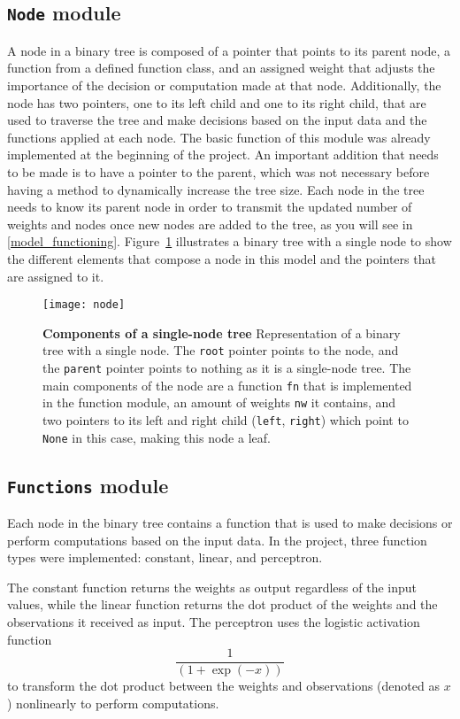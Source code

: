 \subsection{\texttt{Node} module}
A node in a binary tree is composed of a pointer that points to its parent node, a function from a defined function class, and an assigned weight that adjusts the importance of the decision or computation made at that node. Additionally, the node has two pointers, one to its left child and one to its right child, that are used to traverse the tree and make decisions based on the input data and the functions applied at each node. The basic function of this module was already implemented at the beginning of the project. An important addition that needs to be made is to have a pointer to the parent, which was not necessary before having a method to dynamically increase the tree size. Each node in the tree needs to know its parent node in order to transmit the updated number of weights and nodes once new nodes are added to the tree, as you will see in \ref{model_functioning}. Figure~\ref{fig:node_composition} illustrates a binary tree with a single node to show the different elements that compose a node in this model and the pointers that are assigned to it.
\begin{figure}[!ht]
\centering
\texttt{[image: node]}

\caption[Components of a single-node tree]{
  \textbf{Components of a single-node tree}
Representation of a binary tree with a single node. The \texttt{root} pointer points to the node, and the \texttt{parent} pointer points to nothing as it is a single-node tree. The main components of the node are a function \texttt{fn} that is implemented in the function module, an amount of weights \texttt{nw} it contains, and two pointers to its left and right child (\texttt{left}, \texttt{right}) which point to \texttt{None} in this case, making this node a leaf.
 }
\label{fig:node_composition}
\end{figure}

\subsection{\texttt{Functions} module}
Each node in the binary tree contains a function that is used to make decisions or perform computations based on the input data. In the project, three function types were implemented: constant, linear, and perceptron.

The constant function returns the weights as output regardless of the input values, while the linear function returns the dot product of the weights and the observations it received as input. The perceptron uses the logistic activation function
\begin{equation}
\frac{1} {(1 + \exp(-x))}
\end{equation}
 to transform the dot product between the weights and observations (denoted as $x$) nonlinearly to perform computations.

